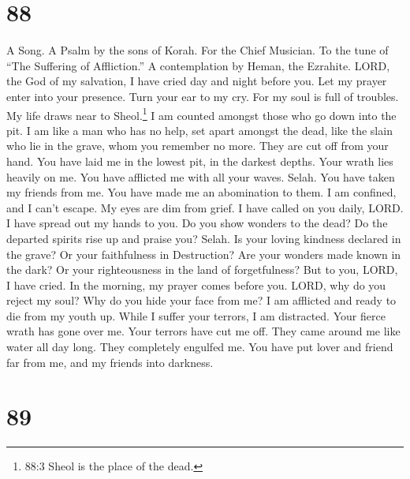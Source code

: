 \hypertarget{section-80}{%
\section{88}\label{section-80}}

A Song. A Psalm by the sons of Korah. For the Chief Musician. To the
tune of ``The Suffering of Affliction.'' A contemplation by Heman, the
Ezrahite.  LORD, the God of my salvation, I have cried day
and night before you.  Let my prayer enter into your
presence. Turn your ear to my cry.  For my soul is full of
troubles. My life draws near to Sheol.\footnote{88:3 Sheol is the place
  of the dead.}  I am counted amongst those who go down into
the pit. I am like a man who has no help,  set apart amongst
the dead, like the slain who lie in the grave, whom you remember no
more. They are cut off from your hand.  You have laid me in
the lowest pit, in the darkest depths.  Your wrath lies
heavily on me. You have afflicted me with all your waves. Selah.
 You have taken my friends from me. You have made me an
abomination to them. I am confined, and I can't escape.  My
eyes are dim from grief. I have called on you daily, LORD. I have spread
out my hands to you.  Do you show wonders to the dead? Do
the departed spirits rise up and praise you? Selah.  Is
your loving kindness declared in the grave? Or your faithfulness in
Destruction?  Are your wonders made known in the dark? Or
your righteousness in the land of forgetfulness?  But to
you, LORD, I have cried. In the morning, my prayer comes before you.
 LORD, why do you reject my soul? Why do you hide your face
from me?  I am afflicted and ready to die from my youth up.
While I suffer your terrors, I am distracted.  Your fierce
wrath has gone over me. Your terrors have cut me off.  They
came around me like water all day long. They completely engulfed me.
 You have put lover and friend far from me, and my friends
into darkness.

\hypertarget{section-81}{%
\section{89}\label{section-81}}

